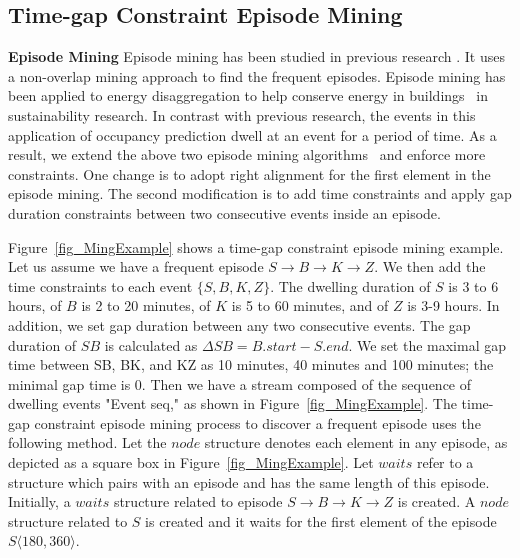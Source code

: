 \subsection{Time-gap Constraint Episode Mining}
\textbf{Episode Mining}
Episode mining has been studied in previous research \cite{mannila1997discovery}. 
It uses a non-overlap mining approach to find the frequent episodes. 
Episode mining has been applied to energy disaggregation to help conserve energy in buildings~\cite{shao2013temporal} in sustainability research. 
In contrast with previous research, 
the events in this application of occupancy prediction 
dwell at an event for a period of time. 
As a result, we extend the above two 
episode mining algorithms~\cite{laxman2008stream,patnaik2008inferring} 
and enforce more constraints.
One change is to 
adopt right alignment for the first element in the episode mining. 
The second modification is to 
add time constraints and 
apply gap duration constraints between 
two consecutive events inside an episode. 
%

Figure~\ref{fig_MingExample} shows a time-gap constraint episode mining example. 
Let us assume we have a frequent episode $S\rightarrow B \rightarrow K\rightarrow Z$. 
We then add the time constraints to each event $\{S,B,K,Z\}$. 
The dwelling duration of $S$ is 3 to 6 hours,   
of $B$ is 2 to 20 minutes, 
of $K$ is 5 to 60 minutes, 
and of $Z$ is 3-9 hours. 
In addition, we set gap duration between any two consecutive events. 
The gap duration of $SB$ is calculated as $\Delta{SB} = B.start-S.end$. 
We set the maximal gap time between SB, BK, and KZ as 
10 minutes, 40 minutes and 100 minutes; 
the minimal gap time is 0. 
Then we have a stream composed of the sequence of dwelling events "Event seq," as shown 
in Figure~\ref{fig_MingExample}.  
 The time-gap constraint episode mining process 
 to discover a frequent episode uses the following method. 
 Let the $node$ structure denotes each element in any episode,  
as depicted as a square box in Figure~\ref{fig_MingExample}.  
Let $waits$ refer to a structure which pairs with an episode 
and has the same length of this episode. 
Initially, a $waits$ structure related to episode $S\rightarrow B \rightarrow K\rightarrow Z$ is created. 
A $node$ structure related to $S$ is created 
and it waits for the first 
element of the episode $S\langle 180, 360 \rangle $. 
